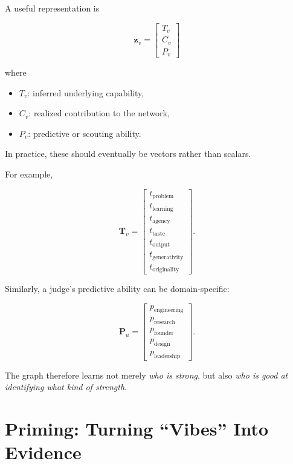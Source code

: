 \documentclass[11pt]{article}
\begin{document}
A useful representation is

\[
\mathbf{z}_v =
\begin{bmatrix}
T_v \\
C_v \\
P_v
\end{bmatrix}
\]

where

\begin{itemize}
    \item \(T_v\): inferred underlying capability,
    \item \(C_v\): realized contribution to the network,
    \item \(P_v\): predictive or scouting ability.
\end{itemize}

In practice, these should eventually be vectors rather than scalars.

For example,

\[
\mathbf{T}_v =
\begin{bmatrix}
t_{\mathrm{problem}} \\
t_{\mathrm{learning}} \\
t_{\mathrm{agency}} \\
t_{\mathrm{taste}} \\
t_{\mathrm{output}} \\
t_{\mathrm{generativity}} \\
t_{\mathrm{originality}}
\end{bmatrix}.
\]

Similarly, a judge's predictive ability can be domain-specific:

\[
\mathbf{P}_u =
\begin{bmatrix}
p_{\mathrm{engineering}} \\
p_{\mathrm{research}} \\
p_{\mathrm{founder}} \\
p_{\mathrm{design}} \\
p_{\mathrm{leadership}}
\end{bmatrix}.
\]

The graph therefore learns not merely \emph{who is strong}, but also
\emph{who is good at identifying what kind of strength}.

\section{Priming: Turning ``Vibes'' Into Evidence}
\end{document}
